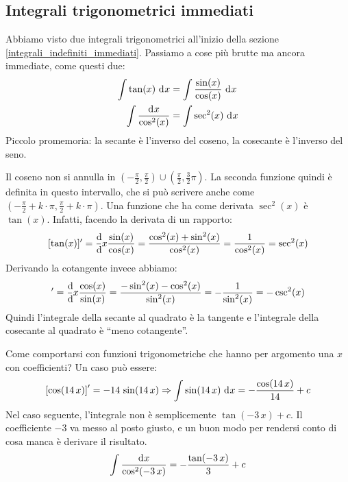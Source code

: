 \subsection{Integrali trigonometrici immediati}

Abbiamo visto due integrali trigonometrici all'inizio della sezione \ref{integrali_indefiniti_immediati}. Passiamo a cose pi\`u brutte ma ancora immediate, come questi due:
\begin{align*}
\int \tan (x) \dx &= \int \frac{\sin(x)}{\cos(x)} \dx \\
\int \frac{\diff x}{\cos^2 (x)} &= \int \sec^2 (x) \dx
\end{align*}
Piccolo promemoria: la secante \`e l'inverso del coseno, la cosecante \`e l'inverso del seno.

Il coseno non si annulla in $(-\frac{\pi}{2}, \frac{\pi}{2}) \cup (\frac{\pi}{2}, \frac{3}{2} \pi)$. La seconda funzione quindi \`e definita in questo intervallo, che si pu\`o scrivere anche come $(- \frac{\pi}{2} + k \cdot \pi, \frac{\pi}{2} + k \cdot \pi)$. Una funzione che ha come derivata $\sec^2 (x)$ \`e $\tan(x)$. Infatti, facendo la derivata di un rapporto:
\[
[\tan(x)]' = \deriv{x} \frac{\sin(x)}{\cos(x)} = \frac{\cos^2 (x) + \sin^2 (x)}{\cos^2(x)} = \frac{1}{\cos^2(x)} = \sec^2 (x)
\]
Derivando la cotangente invece abbiamo:
\begin{align*}
[\cot(x)]' = \deriv{x} \frac{\cos (x)}{\sin (x)} = \frac{- \sin^2(x) - \cos^2 (x)}{\sin^2(x)} = - \frac{1}{\sin^2 (x)} = - \csc^2 (x)
\end{align*}
Quindi l'integrale della secante al quadrato \`e la tangente e l'integrale della cosecante al quadrato \`e ``meno cotangente''.

Come comportarsi con funzioni trigonometriche che hanno per argomento una $x$ con coefficienti? Un caso pu\`o essere:
\[
\left[ \cos (14 \, x) \right]' = - 14 \, \sin (14 \, x) \implies
\int \sin (14 \, x) \dx = - \frac{\cos (14 \, x)}{14}  + c
\]
Nel caso seguente, l'integrale non \`e semplicemente $\tan(-3 \, x) + c$. Il coefficiente $-3$ va messo al posto giusto, e un buon modo per rendersi conto di cosa manca \`e derivare il risultato.
\[
\int \frac{\diff x}{\cos^2 (-3 \, x)} = -\frac{\tan (-3 \, x)}{3} + c
\]

